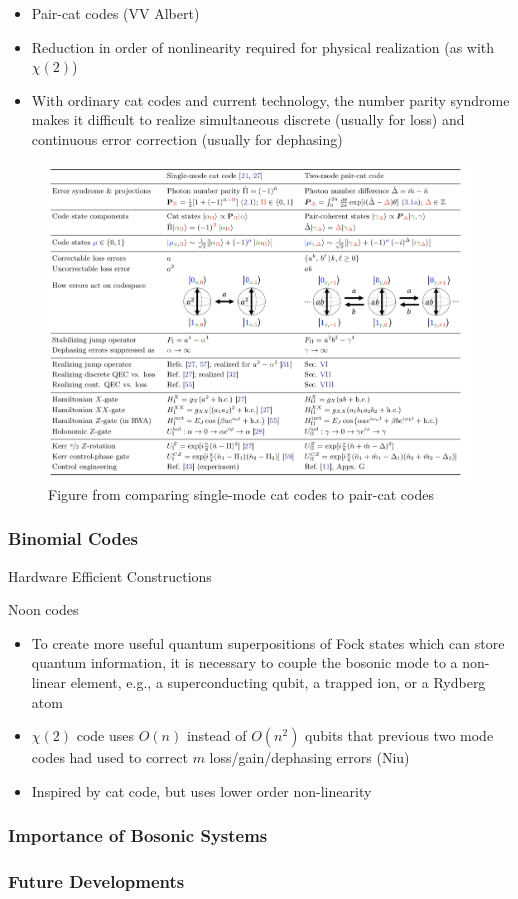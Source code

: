 \documentclass[12]{amsart}
\newcommand\0{\mathbf{0}}
\newcommand\<{\langle}
\renewcommand\>{\rangle}
\begin{document}
\begin{itemize}
		\item Pair-cat codes (VV Albert)
		\item Reduction in order of nonlinearity required for physical realization (as with $\chi(2)$)
		\item With ordinary cat codes and current technology, the number parity syndrome makes it difficult to realize simultaneous discrete (usually for loss) and continuous error correction  (usually for dephasing)
	\end{itemize}

\begin{figure}[H]
\centering
\includegraphics[width=\linewidth,keepaspectratio]{pair_cat.png}	
\caption{Figure from \cite{albert2018multimode} comparing single-mode cat codes to pair-cat codes}
\end{figure}


\subsubsection{Binomial Codes}

Hardware Efficient Constructions

Noon codes

\begin{itemize}
	\item To create more useful quantum superpositions of Fock states which can store quantum information, it is necessary to couple the bosonic mode to a non-linear element, e.g., a superconducting qubit, a trapped ion, or a Rydberg atom
		\item $\chi(2)$ code uses $O(n)$ instead of $O(n^2)$ qubits that previous two mode codes had used to correct $m$ loss/gain/dephasing errors (Niu)
		\item Inspired by cat code, but uses lower order non-linearity
	\end{itemize}

\subsubsection{Importance of Bosonic Systems}

\subsubsection{Future Developments}

\nocite{*}


\end{document}
